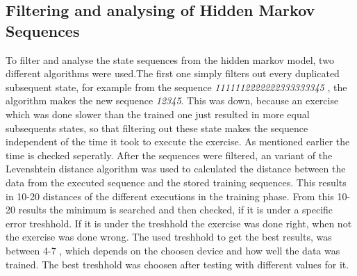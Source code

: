 \subsection{Filtering and analysing of Hidden Markov Sequences}

To filter and analyse the state sequences from the hidden markov model, two different algorithms were used.The first one simply filters out every duplicated subsequent state, for example from the sequence \textit{\small1111112222222333333345} , the algorithm makes the new sequence \textit{\small12345}. This was down, because an exercise which was done slower than the trained one just resulted in more equal subsequents states, so that filtering out these state makes the sequence independent of the time it took to execute the exercise. As mentioned earlier the time is checked seperatly.
\newline
\newline
After the sequences were filtered, an variant of the Levenshtein distance algorithm was used to calculated the distance between the data from the executed sequence and the stored training sequences. This results in 10-20 distances of the different executions in the training phase. From this 10-20 results the minimum is searched and then checked, if it is under a specific error treshhold. If it is under the treshhold the exercise was done right, when not the exercise was done wrong. The used treshhold to get the best results, was between 4-7 , which depends on the choosen device and how well the data was trained. The best treshhold was choosen after testing with different values for it.

